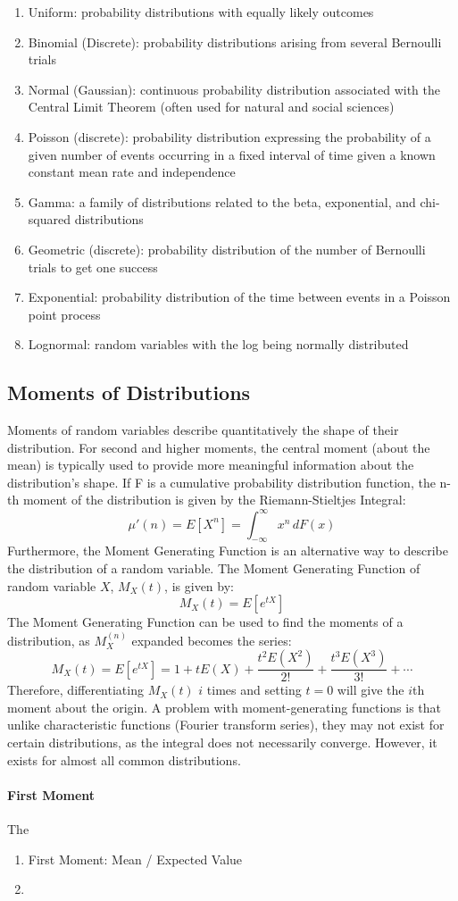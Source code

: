 \documentclass{article}
\begin{document}
\begin{enumerate}
    \item Uniform: probability distributions with equally likely outcomes
    \item Binomial (Discrete): probability distributions arising from several Bernoulli trials
    \item Normal (Gaussian): continuous probability distribution associated with the Central Limit Theorem (often used for natural and social sciences)
    \item Poisson (discrete): probability distribution expressing the probability of a given number of events occurring in a fixed interval of time given a known constant mean rate and independence
    \item Gamma: a family of distributions related to the beta, exponential, and chi-squared distributions
    \item Geometric (discrete): probability distribution of the number of Bernoulli trials to get one success  
    \item Exponential: probability distribution of the time between events in a Poisson point process
    \item Lognormal: random variables with the log being normally distributed
\end{enumerate}

\subsection{Moments of Distributions}
Moments of random variables describe quantitatively the shape of their distribution. For second and higher moments, the central moment (about the mean) is typically used to provide more meaningful information about the distribution's shape. If F is a cumulative probability distribution function, the n-th moment of the distribution is given by the Riemann-Stieltjes Integral:
\[\mu'(n) = E[X^n] = \int_{-\infty}^{\infty} x^n \,dF(x)\]
Furthermore, the Moment Generating Function is an alternative way to describe the distribution of a random variable. The Moment Generating Function of random variable \(X\), \(M_X(t)\), is given by:
\[ M_X(t) = E[e^{tX}] \]
The Moment Generating Function can be used to find the moments of a distribution, as \(M_X^(n)\) expanded becomes the series:
\[ M_X(t) = E[e^{tX}] = 1 + tE(X) + \frac{t^2E(X^2)}{2!} + \frac{t^3E(X^3)}{3!} + \cdots\]
Therefore, differentiating \(M_X(t)\) \(i\) times and setting \(t = 0\) will give the \(i\)th moment about the origin. A problem with moment-generating functions is that unlike characteristic functions (Fourier transform series), they may not exist for certain distributions, as the integral does not necessarily converge. However, it exists for almost all common distributions. 

\paragraph{ First Moment }
The 


\begin{enumerate}
    \item First Moment: Mean / Expected Value
    \item 
\end{enumerate}
\end{document}
